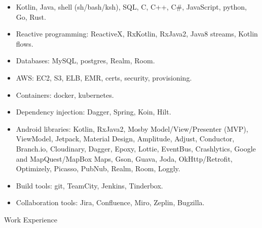 \begin{itemize}
\item Kotlin, Java, shell (sh/bash/ksh), SQL, C, C++, C\#, JavaScript, python, Go, Rust. \\[-18pt]
\item Reactive programming: ReactiveX, RxKotlin, RxJava2, Java8 streams, Kotlin flows. \\[-18pt]
\item Databases: MySQL, postgres, Realm, Room.  \\[-18pt]
\item AWS: EC2, S3, ELB, EMR, certs, security, provisioning.  \\[-18pt]
\item Containers: docker, kubernetes.  \\[-18pt]
\item Dependency injection: Dagger, Spring, Koin, Hilt.   \\[-18pt]
\item Android libraries:
	Kotlin, RxJava2, Mosby Model/View/Presenter (MVP), ViewModel, Jetpack, Material Design,
	   Amplitude, Adjust, Conductor, Branch.io, Cloudinary, Dagger, Epoxy, Lottie, EventBus, Crashlytics,
	   Google and MapQuest/MapBox Maps, Gson, Guava, Joda, OkHttp/Retrofit, Optimizely, Picasso, PubNub,
	   Realm, Room, Loggly. \\[-18pt]
\item Build tools: git, TeamCity, Jenkins, Tinderbox.   \\[-18pt]
\item Collaboration tools: Jira, Confluence, Miro, Zeplin, Bugzilla.   \\
\end{itemize}


\begin{bf} \large
Work Experience
\end{bf}
\medskip

